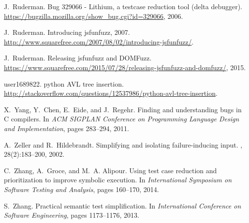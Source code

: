 \documentclass[format=sigconf]{acmart}
\begin{document}
\begin{thebibliography}{10}
J.~Ruderman.
\newblock Bug 329066 - {Lithium}, a testcase reduction tool (delta debugger).
\newblock \url{https://bugzilla.mozilla.org/show_bug.cgi?id=329066}, 2006.

J.~Ruderman.
\newblock Introducing jsfunfuzz, 2007.
\newblock \url{http://www.squarefree.com/2007/08/02/introducing-jsfunfuzz/}.

J.~Ruderman.
\newblock Releasing jsfunfuzz and {DOMFuzz}.
\newblock
  \url{https://www.squarefree.com/2015/07/28/releasing-jsfunfuzz-and-domfuzz/},
  2015.

user1689822.
\newblock python {AVL} tree insertion.
\newblock
  \url{http://stackoverflow.com/questions/12537986/python-avl-tree-insertion}.

X.~Yang, Y.~Chen, E.~Eide, and J.~Regehr.
\newblock Finding and understanding bugs in {C} compilers.
\newblock In {\em ACM SIGPLAN Conference on Programming Language Design and
  Implementation}, pages 283--294, 2011.

A.~Zeller and R.~Hildebrandt.
\newblock Simplifying and isolating failure-inducing input.
, 28(2):183--200,
  2002.

C.~Zhang, A.~Groce, and M.~A. Alipour.
\newblock Using test case reduction and prioritization to improve symbolic
  execution.
\newblock In {\em International Symposium on Software Testing and Analysis},
  pages 160--170, 2014.

S.~Zhang.
\newblock Practical semantic test simplification.
\newblock In {\em International Conference on Software Engineering}, pages
  1173--1176, 2013.

\end{thebibliography}
\end{document}
